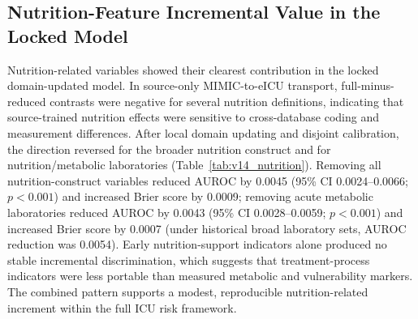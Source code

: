 \documentclass[utf8]{FrontiersinVancouver}
\begin{document}
\subsection{Nutrition-Feature Incremental Value in the Locked Model}
Nutrition-related variables showed their clearest contribution in the locked domain-updated model. In source-only MIMIC-to-eICU transport, full-minus-reduced contrasts were negative for several nutrition definitions, indicating that source-trained nutrition effects were sensitive to cross-database coding and measurement differences. After local domain updating and disjoint calibration, the direction reversed for the broader nutrition construct and for nutrition/metabolic laboratories (Table~\ref{tab:v14_nutrition}). Removing all nutrition-construct variables reduced AUROC by 0.0045 (95\% CI 0.0024--0.0066; $p<0.001$) and increased Brier score by 0.0009; removing acute metabolic laboratories reduced AUROC by 0.0043 (95\% CI 0.0028--0.0059; $p<0.001$) and increased Brier score by 0.0007 (under historical broad laboratory sets, AUROC reduction was 0.0054). Early nutrition-support indicators alone produced no stable incremental discrimination, which suggests that treatment-process indicators were less portable than measured metabolic and vulnerability markers. The combined pattern supports a modest, reproducible nutrition-related increment within the full ICU risk framework.

\begin{table}[htbp]
\centering
\caption{Paired nutrition-feature incremental value for GERI-NutriRisk-ICU in held-out eICU-CRD. Positive AUROC differences favor the full feature set; negative Brier differences favor the full feature set. Bold values indicate the largest favorable domain-updated contrast.}
\label{tab:v14_nutrition}
\end{table}
\end{document}
